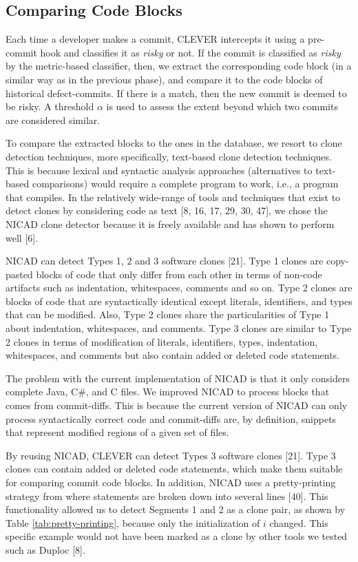 \documentclass[sigconf]{acmart}
\begin{document}
\subsection{Comparing Code Blocks}\label{sec:online}

Each time a developer makes a commit, CLEVER intercepts it using a
pre-commit hook and classifies it as \emph{risky} or not. If the commit
is classified as \emph{risky} by the metric-based classifier, then, we
extract the corresponding code block (in a similar way as in the
previous phase), and compare it to the code blocks of historical
defect-commits. If there is a match, then the new commit is deemed to be
risky. A threshold \(\alpha\) is used to assess the extent beyond which
two commits are considered similar.

To compare the extracted blocks to the ones in the database, we resort
to clone detection techniques, more specifically, text-based clone
detection techniques. This is because lexical and syntactic analysis
approaches (alternatives to text-based comparisons) would require a
complete program to work, i.e., a program that compiles. In the
relatively wide-range of tools and techniques that exist to detect
clones by considering code as text [8, 16, 17, 29, 30, 47], we chose
the NICAD clone detector because it is freely available and has shown to
perform well [6].

NICAD can detect Types 1, 2 and 3 software clones [21]. Type 1
clones are copy-pasted blocks of code that only differ from each other
in terms of non-code artifacts such as indentation, whitespaces,
comments and so on. Type 2 clones are blocks of code that are
syntactically identical except literals, identifiers, and types that can
be modified. Also, Type 2 clones share the particularities of Type 1
about indentation, whitespaces, and comments. Type 3 clones are similar
to Type 2 clones in terms of modification of literals, identifiers,
types, indentation, whitespaces, and comments but also contain added or
deleted code statements.

The problem with the current implementation of NICAD is that it only
considers complete Java, C\#, and C files. We improved NICAD to process
blocks that comes from commit-diffs. This is because the current version
of NICAD can only process syntactically correct code and commit-diffs
are, by definition, snippets that represent modified regions of a given
set of files.

By reusing NICAD, CLEVER can detect Types 3 software clones [21].
Type 3 clones can contain added or deleted code statements, which make
them suitable for comparing commit code blocks. In addition, NICAD uses
a pretty-printing strategy from where statements are broken down into
several lines [40]. This functionality allowed us to detect Segments
1 and 2 as a clone pair, as shown by Table \ref{tab:pretty-printing},
because only the initialization of \(i\) changed. This specific example
would not have been marked as a clone by other tools we tested such as
Duploc [8].
\end{document}

